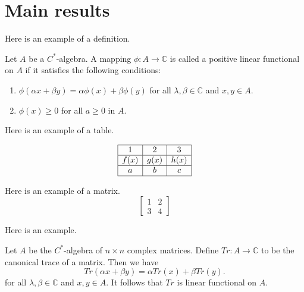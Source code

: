 \documentclass{article}
\begin{document}
\section{Main results}

Here is an example of a definition. 

\begin{definition} Let $A$ be a $C^*$-algebra. A mapping
$\phi :A\rightarrow \mathbb{C} $ is
called a positive linear functional on $A$ if it satisfies the following conditions:

\begin{enumerate}

\item $\phi(\alpha x+\beta y)=\alpha \phi(x)+\beta\phi(y)$ for all $\lambda ,\beta \in  \mathbb{C}$ and $x,y\in A$.

\item $\phi(x)\geq 0$ for all $a\geq 0$ in $A$.
\end{enumerate}
\end{definition}


Here is an example of a table.

\begin{table}[ht]
\caption{}\label{eqtable}
\renewcommand\arraystretch{1.5}
\noindent\[
\begin{array}{|c|c|c|}
\hline
1&2&3\\
\hline f(x)&g(x)&h(x)\\
\hline a&b&c\\
\hline
\end{array}
\]
\end{table}

Here is an example of a matrix.
\begin{equation*}
\begin{bmatrix}
1 & 2 \\
3 &  4
\end{bmatrix}
\end{equation*}


Here is an example.


\begin{example} Let $A$ be the $C^*$-algebra of $n\times n$ complex matrices. Define $Tr: A\rightarrow \mathbb{C}$ to be the canonical trace of a matrix. Then we have
\begin{equation}\label{2.1}
Tr(\alpha x+\beta y)=\alpha Tr(x)+\beta Tr(y).
\end{equation}
for all $\lambda ,\beta \in  \mathbb{C}$ and $x,y\in A$. It follows that $Tr$ is linear functional on $A$.
\end{example}
\end{document}

